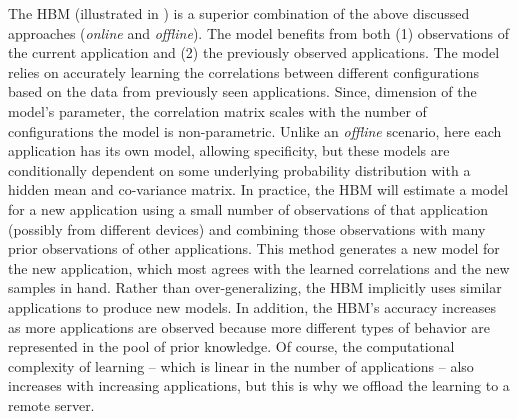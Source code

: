The HBM (illustrated in ) is a superior combination of the
above discussed approaches (\emph{online} and \emph{offline}). The
model benefits from both (1) observations of the current application
and (2) the previously observed applications.  The model relies on
accurately learning the correlations between different configurations
based on the data from previously seen applications. Since, dimension
of the model's parameter, the correlation matrix scales with the
number of configurations the model is non-parametric.  Unlike an
\emph{offline} scenario, here each application has its own model,
allowing specificity, but these models are conditionally dependent on
some underlying probability distribution with a hidden mean and
co-variance matrix. In practice, the HBM will estimate a model for a
new application using a small number of observations of that
application (possibly from different devices) and combining those
observations with many prior observations of other applications. This
method generates a new model for the new application, which most
agrees with the learned correlations and the new samples in hand.
Rather than over-generalizing, the HBM implicitly uses similar
applications to produce new models.  In addition, the HBM's accuracy
increases as more applications are observed because more different
types of behavior are represented in the pool of prior knowledge.  Of
course, the computational complexity of learning -- which is linear in
the number of applications -- also increases with increasing
applications, but this is why we offload the learning to a remote
server.




